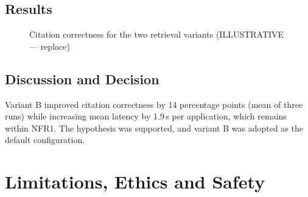 \documentclass[12pt,a4paper,oneside]{report}
\newif\ifguidance
\newcommand{\guide}[1]{%
  \ifguidance
  \begin{tcolorbox}[enhanced,breakable,colback=guidebg,colframe=bmsblue,
    boxrule=0.6pt,arc=2pt,left=6pt,right=6pt,top=4pt,bottom=4pt,
    fonttitle=\bfseries\small,title={What to write here},
    before upper={\small\setstretch{1.1}}]
  #1
  \end{tcolorbox}
  \fi}
\newcommand{\dodont}[2]{%
  \ifguidance
  \begin{tcolorbox}[enhanced,breakable,sidebyside,sidebyside align=top seam,
    colback=dobg,colbacklower=dontbg,colframe=gray!60,boxrule=0.5pt,arc=2pt,
    lefthand ratio=0.5,left=5pt,right=5pt,top=4pt,bottom=4pt,
    fontupper=\small\setstretch{1.05},fontlower=\small\setstretch{1.05}]
  \textbf{\textcolor{ForestGreen}{\checkmark\ Do}}
  \begin{itemize}[leftmargin=12pt,itemsep=1pt,topsep=2pt]#1\end{itemize}
  \tcblower
  \textbf{\textcolor{BrickRed}{$\times$ Don't}}
  \begin{itemize}[leftmargin=12pt,itemsep=1pt,topsep=2pt]#2\end{itemize}
  \end{tcolorbox}
  \fi}
\newcommand{\pagebudget}[1]{%
  \ifguidance\noindent{\small\textcolor{bmsblue}{\textbf{Expected length:} #1 pages}}\par\medskip\fi}
\newenvironment{sample}
  {\par\noindent{\footnotesize\bfseries\textcolor{BrickRed}{[SAMPLE --- replace with your own content]}}\par\color{samplecol}}
  {\par\medskip}
\begin{document}
\section{Results}
\guide{Present the comparison as a table or chart, with spread across runs.}
\dodont{\item Report both the benefit and the cost.
}
{\item Do not hide a latency or cost increase.
}
\begin{sample}
\begin{figure}[H]
\centering
{}
\caption{Citation correctness for the two retrieval variants \textcolor{BrickRed}{(ILLUSTRATIVE --- replace)}}
\label{fig:ab}
\end{figure}
\end{sample}

\section{Discussion and Decision}
\guide{State whether the hypothesis was supported, discuss the trade-off, and state the decision you
took as a result.}
\dodont{\item State the decision explicitly (``we adopted variant B because\ldots'').}
{\item Do not declare a winner from a single run.}
\begin{sample}
Variant B improved citation correctness by 14 percentage points (mean of three runs) while increasing
mean latency by 1.9\,s per application, which remains within NFR1. The hypothesis was supported, and
variant B was adopted as the default configuration.
\end{sample}


\chapter{Limitations, Ethics and Safety}
\pagebudget{2--3}
\guide{Be honest and specific. Reviewers give credit for clear thinking about failure modes, not for
claiming that the system has none.}
\end{document}
